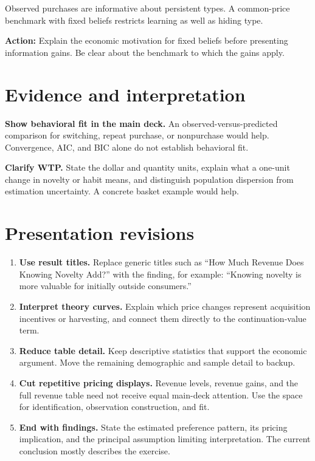 \documentclass[11pt]{article}
\begin{document}
Observed purchases are informative about persistent types. A common-price benchmark with fixed beliefs restricts learning as well as hiding type.

\textbf{Action:} Explain the economic motivation for fixed beliefs before presenting information gains. Be clear about the benchmark to which the gains apply.

\section{Evidence and interpretation}
\textbf{Show behavioral fit in the main deck.} An observed-versus-predicted comparison for switching, repeat purchase, or nonpurchase would help. Convergence, AIC, and BIC alone do not establish behavioral fit.

\textbf{Clarify WTP.} State the dollar and quantity units, explain what a one-unit change in novelty or habit means, and distinguish population dispersion from estimation uncertainty. A concrete basket example would help.

\newpage
\section{Presentation revisions}
\begin{enumerate}[itemsep=7pt]
\item \textbf{Use result titles.} Replace generic titles such as ``How Much Revenue Does Knowing Novelty Add?'' with the finding, for example: ``Knowing novelty is more valuable for initially outside consumers.''
\item \textbf{Interpret theory curves.} Explain which price changes represent acquisition incentives or harvesting, and connect them directly to the continuation-value term.
\item \textbf{Reduce table detail.} Keep descriptive statistics that support the economic argument. Move the remaining demographic and sample detail to backup.
\item \textbf{Cut repetitive pricing displays.} Revenue levels, revenue gains, and the full revenue table need not receive equal main-deck attention. Use the space for identification, observation construction, and fit.
\item \textbf{End with findings.} State the estimated preference pattern, its pricing implication, and the principal assumption limiting interpretation. The current conclusion mostly describes the exercise.
\end{enumerate}
\end{document}
